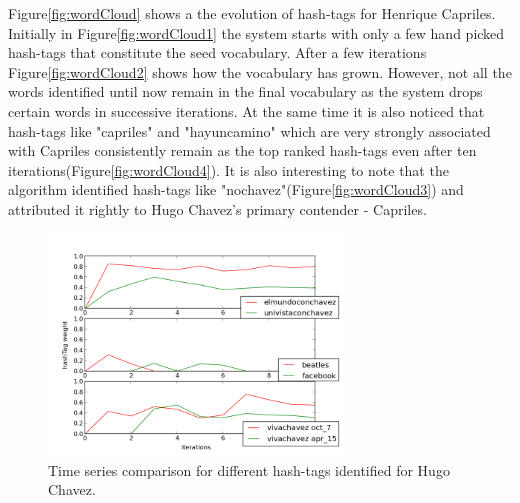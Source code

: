 Figure\ref{fig:wordCloud} shows a  the evolution  of hash-tags for Henrique Capriles.
Initially in Figure\ref{fig:wordCloud1} the system starts with only a few hand picked hash-tags that constitute the seed vocabulary. 
After a few iterations Figure\ref{fig:wordCloud2} shows how the vocabulary has grown.
However, not all the words identified until now remain in the final vocabulary as the system drops certain words in successive iterations.
At the same time it is also noticed that hash-tags like "capriles" and "hayuncamino" which are very strongly associated with Capriles consistently remain as the top ranked hash-tags even after ten iterations(Figure\ref{fig:wordCloud4}). 
It is also interesting to note that the algorithm identified hash-tags like "nochavez"(Figure\ref{fig:wordCloud3}) and attributed it rightly to Hugo Chavez's primary contender - Capriles. 
\newline
\begin{figure}[Ht]
	\centering
	\includegraphics[width=0.7\textwidth, height=0.3\textheight]{support_files/hashTagTimeSeries.png}
\vspace{-1em}
	\caption{Time series comparison for different hash-tags identified for Hugo Chavez. }
	\label{fig:timeSeries}
	\vspace{-1em}
\end{figure}

